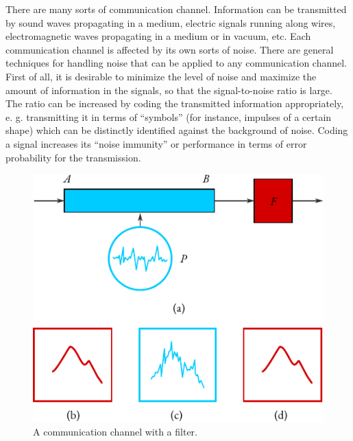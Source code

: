  There are many
sorts of communication channel. Information can be transmitted by
sound waves propagating in a medium, electric signals running along
wires, electromagnetic waves propagating in a medium or in vacuum,
etc. Each communication channel is affected by its own sorts of noise.
There are general techniques for handling noise that can be applied to
any communication channel. First of all, it is desirable to minimize the
level of noise and maximize the amount of information in the signals, so
that the signal-to-noise ratio is large. The ratio can be increased by
coding the transmitted information appropriately, e. g. transmitting it in
terms of ``symbols'' (for instance, impulses of a certain shape) which can
be distinctly identified against the background of noise. Coding a signal
increases its ``noise immunity'' or performance in terms of error
probability for the transmission.
\begin{figure}[!ht]
 \centering
 \includegraphics[width=0.8\linewidth]{figures/noise1.pdf}
\caption{A communication channel with a filter.\label{noise1}}
 \end{figure}
 
